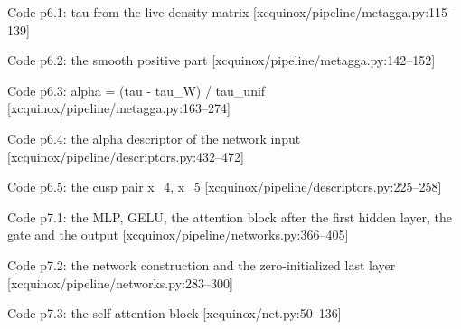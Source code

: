 \begin{frame}[allowframebreaks]{Code p6.1: tau from the live density matrix [xcquinox/pipeline/metagga.py:115--139]}
\label{code:p6_1_tau_from_the_live_density_matrix}
\end{frame}
\begin{frame}[allowframebreaks]{Code p6.2: the smooth positive part [xcquinox/pipeline/metagga.py:142--152]}
\label{code:p6_2_the_smooth_positive_part}
\end{frame}
\begin{frame}[allowframebreaks]{Code p6.3: alpha = (tau - tau\_W) / tau\_unif [xcquinox/pipeline/metagga.py:163--274]}
\label{code:p6_3_alpha_tau_tau_w_tau_unif}
\end{frame}
\begin{frame}[allowframebreaks]{Code p6.4: the alpha descriptor of the network input [xcquinox/pipeline/descriptors.py:432--472]}
\label{code:p6_4_the_alpha_descriptor_of_the_network_inpu}
\end{frame}
\begin{frame}[allowframebreaks]{Code p6.5: the cusp pair x\_4, x\_5 [xcquinox/pipeline/descriptors.py:225--258]}
\label{code:p6_5_the_cusp_pair_x_4_x_5}
\end{frame}
\begin{frame}[allowframebreaks]{Code p7.1: the MLP, GELU, the attention block after the first hidden layer, the gate and the output [xcquinox/pipeline/networks.py:366--405]}
\label{code:p7_1_the_mlp_gelu_the_attention_block_after_t}
\end{frame}
\begin{frame}[allowframebreaks]{Code p7.2: the network construction and the zero-initialized last layer [xcquinox/pipeline/networks.py:283--300]}
\label{code:p7_2_the_network_construction_and_the_zero_in}
\end{frame}
\begin{frame}[allowframebreaks]{Code p7.3: the self-attention block [xcquinox/net.py:50--136]}
\label{code:p7_3_the_self_attention_block}
\end{frame}

